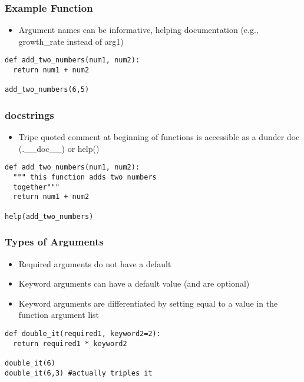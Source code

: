 \documentclass{beamer}
\begin{document}
\begin{frame}[fragile]
\frametitle{Example Function}
\begin{itemize}
\item Argument names can be informative, helping documentation (e.g., growth\_rate instead of arg1)
\end{itemize}
\begin{lstlisting}
def add_two_numbers(num1, num2):
  return num1 + num2
  
add_two_numbers(6,5)
\end{lstlisting}
\end{frame}

\begin{frame}[fragile]
\frametitle{docstrings}
\begin{itemize}
\item Tripe quoted comment at beginning of functions is accessible as a dunder doc (.\_\_doc\_\_) or help()
\end{itemize}
\begin{lstlisting}
def add_two_numbers(num1, num2):
  """ this function adds two numbers
  together"""
  return num1 + num2
  
help(add_two_numbers)
\end{lstlisting}
\end{frame}

\begin{frame}[fragile]
\frametitle{Types of Arguments}
\begin{itemize}
\item Required arguments do not have a default
\item Keyword arguments can have a default value (and are optional)
\item Keyword arguments are differentiated by setting equal to a value in the function argument list
\end{itemize}
\begin{lstlisting}
def double_it(required1, keyword2=2):
  return required1 * keyword2
  
double_it(6)
double_it(6,3) #actually triples it
\end{lstlisting}
\end{frame}
\end{document}
